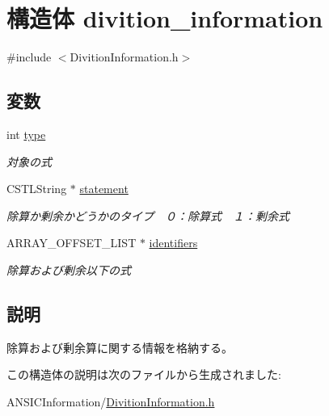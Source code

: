 \section{構造体 divition\_\-information}
\label{structdivition__information}


{\ttfamily \#include $<$DivitionInformation.h$>$}

\subsection*{変数}
\begin{DoxyCompactItemize}
\item 
int \hyperlink{structdivition__information_a47c7af44ae5f360dc369efd35b72129e}{type}\label{structdivition__information_a47c7af44ae5f360dc369efd35b72129e}

\begin{DoxyCompactList}\small\item\em 対象の式 \item\end{DoxyCompactList}\item 
CSTLString $\ast$ \hyperlink{structdivition__information_ad79d014f72312183ee99402b6b2001e9}{statement}\label{structdivition__information_ad79d014f72312183ee99402b6b2001e9}

\begin{DoxyCompactList}\small\item\em 除算か剰余かどうかのタイプ　０：除算式　１：剰余式 \item\end{DoxyCompactList}\item 
ARRAY\_\-OFFSET\_\-LIST $\ast$ \hyperlink{structdivition__information_aef16f1ef4d1f8cb9e2440017dd8c004f}{identifiers}\label{structdivition__information_aef16f1ef4d1f8cb9e2440017dd8c004f}

\begin{DoxyCompactList}\small\item\em 除算および剰余以下の式 \item\end{DoxyCompactList}\end{DoxyCompactItemize}


\subsection{説明}
除算および剰余算に関する情報を格納する。 

この構造体の説明は次のファイルから生成されました:\begin{DoxyCompactItemize}
\item 
ANSICInformation/\hyperlink{DivitionInformation_8h}{DivitionInformation.h}\end{DoxyCompactItemize}
